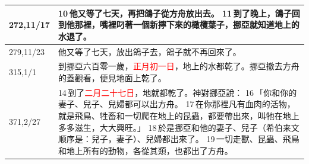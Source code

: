 \begin{table}[H]
\begin{tabular}{p{1.75cm}|p{15.50cm}}
272,11/17&10 他又等了七天，再把鴿子從方舟放出去。 11 到了晚上，鴿子回到他那裡，嘴裡叼著一個新擰下來的橄欖葉子，挪亞就知道地上的水退了。\\\hline
279,11/23&他又等了七天，放出鴿子去，鴿子就不再回來了。\\\hline
315,1/1&到挪亞六百零一歲，\textcolor{red}{正月初一日}，地上的水都乾了。挪亞撤去方舟的蓋觀看，便見地面上乾了。 \\\hline
371,2/27&14 到了\textcolor{red}{二月二十七日}，地就都乾了。神對挪亞說： 16 「你和你的妻子、兒子、兒婦都可以出方舟。 17 在你那裡凡有血肉的活物，就是飛鳥、牲畜和一切爬在地上的昆蟲，都要帶出來，叫牠在地上多多滋生，大大興旺。」 18 於是挪亞和他的妻子、兒子（希伯来文顺序是：兒子，妻子）、兒婦都出來了。 19 一切走獸、昆蟲、飛鳥和地上所有的動物，各從其類，也都出了方舟。\\\hline
\end{tabular}
\end{table}


